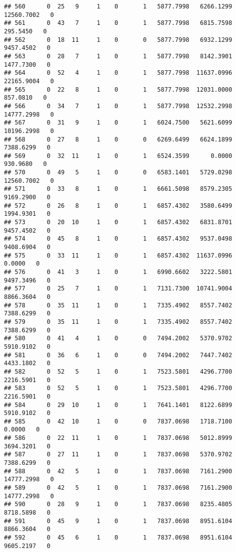 \documentclass[
]{article}
\begin{document}
\begin{enumerate}
\begin{verbatim}
## 560      0  25   9     1    0       1   5877.7998   6266.1299  12560.7002   0
## 561      0  43   7     1    0       1   5877.7998   6815.7598    295.5450   0
## 562      0  18  11     1    0       0   5877.7998   6932.1299   9457.4502   0
## 563      0  28   7     1    0       1   5877.7998   8142.3901   1477.7300   0
## 564      0  52   4     1    0       1   5877.7998  11637.0996  22165.9004   0
## 565      0  22   8     1    0       1   5877.7998  12031.0000    857.0810   0
## 566      0  34   7     1    0       1   5877.7998  12532.2998  14777.2998   0
## 567      0  31   9     1    0       1   6024.7500   5621.6099  10196.2998   0
## 568      0  27   8     1    0       0   6269.6499   6624.1899   7388.6299   0
## 569      0  32  11     1    0       1   6524.3599      0.0000    930.9680   0
## 570      0  49   5     1    0       0   6583.1401   5729.0298  12560.7002   0
## 571      0  33   8     1    0       1   6661.5098   8579.2305   9169.2900   0
## 572      0  26   8     1    0       1   6857.4302   3580.6499   1994.9301   0
## 573      0  20  10     1    0       1   6857.4302   6831.8701   9457.4502   0
## 574      0  45   8     1    0       1   6857.4302   9537.0498   9408.6904   0
## 575      0  33  11     1    0       1   6857.4302  11637.0996      0.0000   0
## 576      0  41   3     1    0       1   6990.6602   3222.5801   9497.3496   0
## 577      0  25   7     1    0       1   7131.7300  10741.9004   8866.3604   0
## 578      0  35  11     1    0       1   7335.4902   8557.7402   7388.6299   0
## 579      0  35  11     1    0       1   7335.4902   8557.7402   7388.6299   0
## 580      0  41   4     1    0       0   7494.2002   5370.9702   5910.9102   0
## 581      0  36   6     1    0       0   7494.2002   7447.7402   4433.1802   0
## 582      0  52   5     1    0       1   7523.5801   4296.7700   2216.5901   0
## 583      0  52   5     1    0       1   7523.5801   4296.7700   2216.5901   0
## 584      0  29  10     1    0       1   7641.1401   8122.6899   5910.9102   0
## 585      0  42  10     1    0       0   7837.0698   1718.7100      0.0000   0
## 586      0  22  11     1    0       1   7837.0698   5012.8999   3694.3201   0
## 587      0  27  11     1    0       1   7837.0698   5370.9702   7388.6299   0
## 588      0  42   5     1    0       1   7837.0698   7161.2900  14777.2998   0
## 589      0  42   5     1    0       1   7837.0698   7161.2900  14777.2998   0
## 590      0  28   9     1    0       1   7837.0698   8235.4805   8718.5898   0
## 591      0  45   9     1    0       1   7837.0698   8951.6104   8866.3604   0
## 592      0  45   6     1    0       1   7837.0698   8951.6104   9605.2197   0

\end{verbatim}
\end{enumerate}
\end{document}
